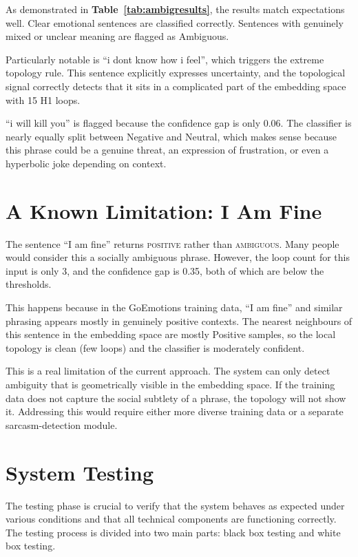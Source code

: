 As demonstrated in \textbf{Table~\ref{tab:ambigresults}}, the results match expectations well. Clear
emotional sentences are classified correctly. Sentences with genuinely mixed or unclear meaning
are flagged as Ambiguous.

Particularly notable is ``i dont know how i feel'', which triggers the extreme topology rule.
This sentence explicitly expresses uncertainty, and the topological signal correctly detects that
it sits in a complicated part of the embedding space with 15 H1 loops.

``i will kill you'' is flagged because the confidence gap is only 0.06. The classifier is nearly
equally split between Negative and Neutral, which makes sense because this phrase could be a
genuine threat, an expression of frustration, or even a hyperbolic joke depending on context.

\section{A Known Limitation: I Am Fine}

The sentence ``I am fine'' returns \textsc{positive} rather than \textsc{ambiguous}. Many
people would consider this a socially ambiguous phrase. However, the loop count for this input
is only 3, and the confidence gap is 0.35, both of which are below the thresholds.

This happens because in the GoEmotions training data, ``I am fine'' and similar phrasing
appears mostly in genuinely positive contexts. The nearest neighbours of this sentence in the
embedding space are mostly Positive samples, so the local topology is clean (few loops) and the
classifier is moderately confident.

This is a real limitation of the current approach. The system can only detect ambiguity that is
geometrically visible in the embedding space. If the training data does not capture the social
subtlety of a phrase, the topology will not show it. Addressing this would require either more
diverse training data or a separate sarcasm-detection module.

\section{System Testing}

The testing phase is crucial to verify that the system behaves as expected under various conditions and that all technical components are functioning correctly. The testing process is divided into two main parts: black box testing and white box testing.

